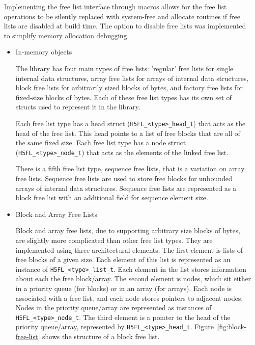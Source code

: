 Implementing the free list interface through macros allows for the free list operations to be silently replaced with system-free and allocate routines if free lists are disabled at build time. The option to disable free lists was implemented to simplify memory allocation debugging.

\begin{itemize}

\item In-memory objects

The library has four main types of free lists: 'regular' free lists for single internal data structures, array free lists for arrays of internal data structures, block free lists for arbitrarily sized blocks of bytes, and factory free lists for fixed-size blocks of bytes. Each of these free list types has its own set of structs used to represent it in the library. 

Each free list type has a head struct (\texttt{H5FL\_<type>\_head\_t}) that acts as the head of the free list. This head points to a list of free blocks that are all of the same fixed size. Each free list type has a node struct (\texttt{H5FL\_<type>\_node\_t}) that acts as the elements of the linked free list. 


There is a fifth free list type, sequence free lists, that is a variation on array free lists. Sequence free lists are used to store free blocks for unbounded arrays of internal data structures. Sequence free lists are represented as a block free list with an additional field for sequence element size.

\item Block and Array Free Lists

Block and array free lists, due to supporting arbitrary size blocks of bytes, are slightly more complicated than other free list types. They are implemented using three architectural elements. The first element is lists of free blocks of a given size. Each element of this list is represented as an instance of \texttt{H5FL\_<type>\_list\_t}. Each element in the list stores information about each the free block/array. The second element is nodes, which sit either in a priority queue (for blocks) or in an array (for arrays). Each node is associated with a free list, and each node stores pointers to adjacent nodes. Nodes in the priority queue/array are represented as instances of \texttt{H5FL\_<type>\_node\_t}. The third element is a pointer to the head of the priority queue/array, represented by \texttt{H5FL\_<type>\_head\_t}. Figure~\ref{fig:block-free-list} shows the structure of a block free list.


\end{itemize}
